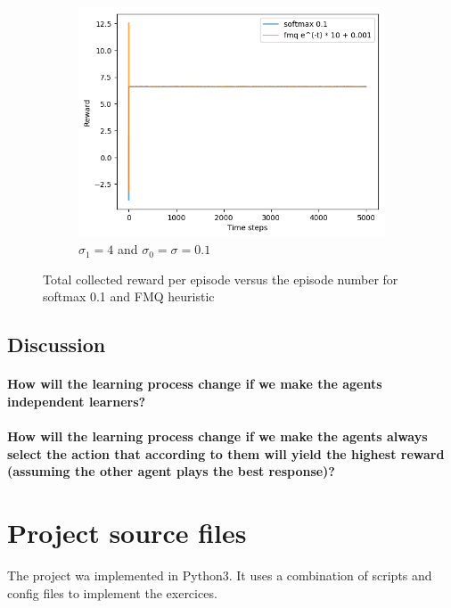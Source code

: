 \documentclass[letterpaper]{article}
\begin{document}
\begin{figure}[H]
\begin{subfigure}{.5\textwidth}
    \centering
    \includegraphics[width=1\linewidth]{images/assign3/exc/rewards}
    \caption{$\sigma_1 = 4$ and $\sigma_0 = \sigma = 0.1$}
    \label{fig:climbing_rewards_exc}
  \end{subfigure}
    \caption{Total collected reward per episode
    versus the episode number for softmax 0.1 and FMQ heuristic}
    \label{fig:climbing_rewards}
\end{figure}


\subsection{Discussion}

\paragraph{How will the learning process change
if we make the agents independent learners?}

\paragraph{How will the learning process change if we make
the agents always select the action that according
to them will yield the highest reward (assuming the
other agent plays the best response)?}


\section{Project source files}

The project wa implemented in Python3. It uses a combination of
scripts and config files to implement the exercices.
\end{document}
